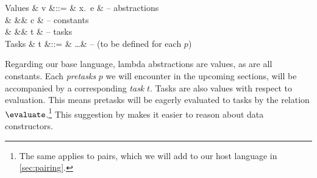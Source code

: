 \begin{grammar}
  Values
    & v &::= & \lambda x.\ e  & – abstractions \\
    &   &\mid& c              & – constants \\
    &   &\mid& t              & – tasks \\
  Tasks
    & t &::= & \ldots         & – (to be defined for each $p$) \\
\end{grammar}
Regarding our base language, lambda abstractions are values, as are all constants.
Each \emph{pretasks} $p$ we will encounter in the upcoming sections,
will be accompanied by a corresponding \emph{task} $t$.
Tasks are also values with respect to evaluation.
This means pretasks will be eagerly evaluated to tasks by the relation $\evaluate$.\footnote{
  The same applies to pairs,
  which we will add to our host language in \autoref{sec:pairing}.
}
This suggestion by \textcite[p. 323]{books/Harper16PFPL}
makes it easier to reason about data constructors.
